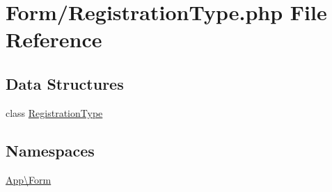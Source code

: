 \hypertarget{_registration_type_8php}{}\section{Form/\+Registration\+Type.php File Reference}
\label{_registration_type_8php}
\subsection*{Data Structures}
\begin{DoxyCompactItemize}
\item 
class \mbox{\hyperlink{class_app_1_1_form_1_1_registration_type}{Registration\+Type}}
\end{DoxyCompactItemize}
\subsection*{Namespaces}
\begin{DoxyCompactItemize}
\item 
 \mbox{\hyperlink{namespace_app_1_1_form}{App\textbackslash{}\+Form}}
\end{DoxyCompactItemize}
